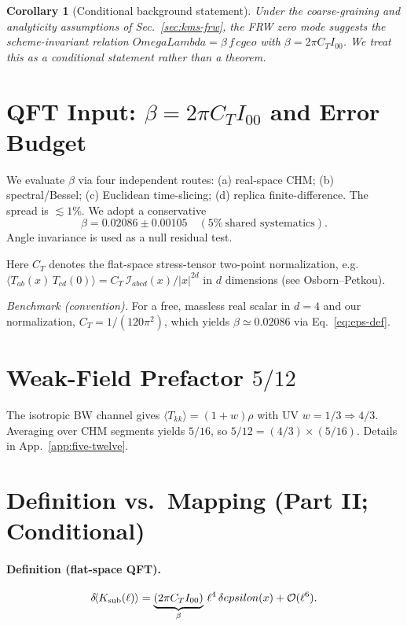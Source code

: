 \documentclass[aps,prd,onecolumn,superscriptaddress,nofootinbib]{revtex4-2}
\def\OmL{OmegaLambda}%
\def\cgeo{cgeo}%
\def\eps{epsilon}%
\def\Omega_\Lambda{OmegaLambda}%
\providecommand{\OmL}{\Omega_\Lambda}
\providecommand{\cgeo}{c_{\rm geo}}
\providecommand{\eps}{\varepsilon}
\providecommand{\be}{\begin{equation}}
\providecommand{\ee}{\end{equation}}
\newtheorem{corollary}{Corollary}
\begin{document}
\begin{corollary}[Conditional background statement]\label{cor:background-cond}
Under the coarse-graining and analyticity assumptions of Sec.~\ref{sec:kms-frw}, the FRW zero mode \emph{suggests} the scheme-invariant relation
\(\OmL=\beta\,f\,\cgeo\) with \(\beta=2\pi C_T I_{00}\). We treat this as a conditional statement rather than a theorem.
\end{corollary}

\section{QFT Input: \texorpdfstring{$\beta=2\pi C_T I_{00}$}{beta} and Error Budget}
\label{sec:beta}
We evaluate \(\beta\) via four independent routes: (a) real-space CHM; (b) spectral/Bessel; (c) Euclidean time-slicing; (d) replica finite-difference. The spread is \(\lesssim 1\%\). We adopt a conservative
\be
\beta=0.02086\pm 0.00105 \quad (5\%~\text{shared systematics}).
\ee
Angle invariance is used as a null residual test.

\noindent Here \(C_T\) denotes the flat-space stress-tensor two-point normalization, e.g.
\(\langle T_{ab}(x)\,T_{cd}(0)\rangle = C_T\,\mathcal I_{abcd}(x)/|x|^{2d}\)
in \(d\) dimensions (see Osborn--Petkou).

\noindent\emph{Benchmark (convention).} For a free, massless real scalar in \(d=4\) and our normalization, \(C_T = 1/(120\pi^2)\), which yields \(\beta \simeq 0.02086\) via Eq.~\eqref{eq:eps-def}.

\section{Weak-Field Prefactor \texorpdfstring{$5/12$}{5/12}}
\label{sec:five-twelve}
The isotropic BW channel gives \(\langle T_{kk}\rangle=(1+w)\rho\) with UV \(w=1/3\Rightarrow 4/3\). Averaging over CHM segments yields \(5/16\), so \(5/12=(4/3)\times(5/16)\). Details in App.~\ref{app:five-twelve}.

\section{Definition vs.\ Mapping (Part II; Conditional)}
\label{sec:def-vs-map}

\paragraph{Definition (flat-space QFT).}
\be
\label{eq:eps-def}
\delta\!\langle K_{\rm sub}(\ell)\rangle=\underbrace{(2\pi C_T I_{00})}_{\beta}\,\ell^4\,\delta\eps(x)+\mathcal O(\ell^6).
\ee
\end{document}
